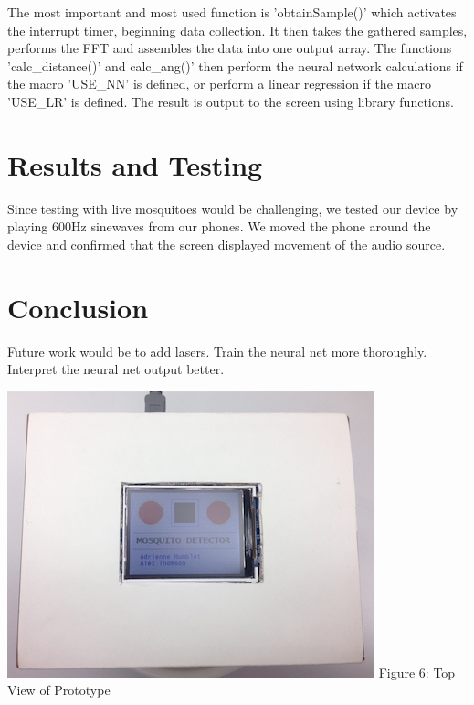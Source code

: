 \documentclass[twoside]{article}
\begin{document}
\begin{multicols}{2}
The most important and most used function is 'obtainSample()' which activates the interrupt timer, beginning data collection. It then takes the gathered samples, performs the FFT and assembles the data into one output array. The functions 'calc\_distance()' and calc\_ang()' then perform the neural network calculations if the macro 'USE\_NN' is defined, or perform a linear regression if the macro 'USE\_LR' is defined. The result is output to the screen using library functions.


\section{Results and Testing}

Since testing with live mosquitoes would be challenging, we tested our device by playing 600Hz sinewaves from our phones. We moved the phone around the device and confirmed that the screen displayed movement of the audio source. 

\section{Conclusion}

Future work would be to add lasers. Train the neural net more thoroughly. Interpret the neural net output better. 

\begin{center}
\includegraphics[scale=0.40]{topView.png}
\newline Figure 6:  Top View of Prototype
\end{center}


\end{multicols}
\end{document}
